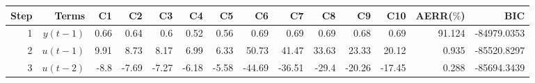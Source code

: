 \begin{tabular}{rrrrrrrrrrrrrr}
Step & Terms & C1 & C2 & C3 & C4 & C5 & C6 & C7 & C8 & C9 & C10 & AERR($\%$) & BIC \\ 
\hline 
1 & $y(t-1)$ & 0.66 & 0.64 & 0.6 & 0.52 & 0.56 & 0.69 & 0.69 & 0.69 & 0.68 & 0.69 & 91.124 & -84979.0353 \\ 
2 & $u(t-1)$ & 9.91 & 8.73 & 8.17 & 6.99 & 6.33 & 50.73 & 41.47 & 33.63 & 23.33 & 20.12 & 0.935 & -85520.8297 \\ 
3 & $u(t-2)$ & -8.8 & -7.69 & -7.27 & -6.18 & -5.58 & -44.69 & -36.51 & -29.4 & -20.26 & -17.45 & 0.288 & -85694.3439 \\ 
\hline 
\end{tabular}